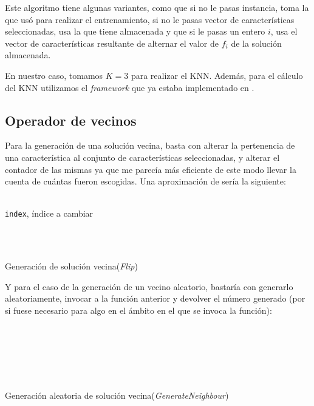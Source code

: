 		Este algoritmo tiene algunas variantes, como que si no le pasas instancia, toma la que
		usó para realizar el entrenamiento, si no le pasas vector de características seleccionadas,
		usa la que tiene almacenada y que si le pasas un entero $i$, usa el vector de características
		resultante de alternar el valor de $f_i$ de la solución almacenada.
		
		En nuestro caso, tomamos $K=3$ para realizar el KNN. Además, para el cálculo del KNN
		utilizamos el \textit{framework} que ya estaba implementado en \cite{KNN}.
	
	\subsection{Operador de vecinos}
		Para la generación de una solución vecina, basta con alterar la pertenencia de una
		característica al conjunto de características seleccionadas, y alterar el contador
		de las mismas ya que me parecía más eficiente de este modo llevar la cuenta de cuántas
		fueron escogidas. Una aproximación de sería la siguiente:
		
		\begin{algorithm}[H]
			\begin{algorithmic}[1]
				\REQUIRE \ \\
		        	\texttt{index}, índice a cambiar\\ \

		     	\\
				\ELSE
				\ENDIF
			\end{algorithmic}
		\caption{Generación de solución vecina(\textit{Flip})}
		\label{Flip}
		\end{algorithm}
	
		Y para el caso de la generación de un vecino aleatorio, bastaría con generarlo aleatoriamente,
		invocar a la función anterior y devolver el número generado (por si fuese necesario
		para algo en el ámbito en el que se invoca la función):
	
		\begin{algorithm}[H]
			\begin{algorithmic}[1]
				\REQUIRE \ \\
					 \

		     	\\
		  		\\
		  		
			\end{algorithmic}
		\caption{Generación aleatoria de solución vecina(\textit{GenerateNeighbour})}
		\label{Neighbour}
		\end{algorithm}
	
